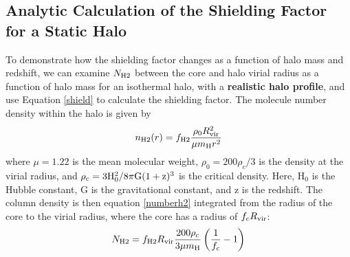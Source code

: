 \documentclass[fleqn,usenatbib]{mnras}
\begin{document}
\subsection{Analytic Calculation of the Shielding Factor for a Static Halo}
To demonstrate how the shielding factor changes as a function of halo mass and redshift, we can examine $N_{\rm H2}$ between the core and halo virial radius as a function of halo mass for an isothermal halo, with a \textbf{realistic \hh{} halo profile}, and use Equation \ref{shield} to calculate the shielding factor. The \hh{} molecule number density within the halo is given by 
\begin{equation} \label{numberh2}
	n_{\rm H2}(r) = f_{\rm H2} \frac{\rho_{0}R^{2}_{\rm vir}}{\mu m_{\rm H} r^{2}}
\end{equation}
where $\mu = 1.22$ is the mean molecular weight, $\rho_{0} = 200 \rho_{c} / 3$ is the density at the virial radius, and $\rho_{c} = 3 \rm H_{0}^{2} / 8 \pi G (1+z)^3$ is the critical density. Here, H$_{0}$ is the Hubble constant, G is the gravitational constant, and z is the redshift. The column density is then equation \ref{numberh2} integrated from the radius of the core to the virial radius, where the core has a radius of $f_{c} R_{\rm vir}$: 
\begin{equation} \label{columnh2}
	N_{\rm H2} = f_{\rm H2} R_{\rm vir} \frac{200 \rho_{c}}{3 \mu m_{\rm H}} \left(\frac{1}{f_{c}} - 1 \right)
\end{equation}
\end{document}
